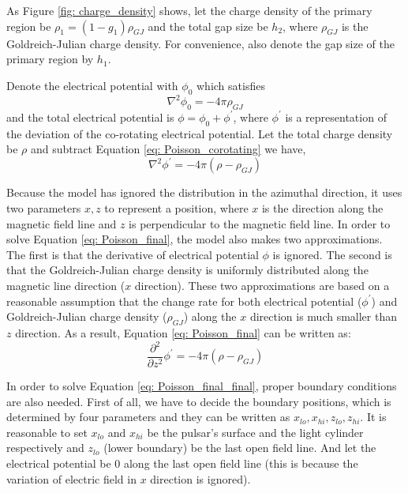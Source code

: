 \documentclass[12pt]{report}
\newcommand{\gj}[0]{
  Goldreich-Julian charge density
}
\newcommand{\myComment}[1]{
  \newline
}
\begin{document}
        As Figure \ref{fig: charge_density} shows, 
        let the charge density of the primary region be $\rho_1 = (1-g_{1}) \rho_{GJ}$ and 
        the total gap size be
        $h_{2}$, where $\rho_{GJ}$ is the Goldreich-Julian charge density. For convenience, 
        also denote the gap size of the primary region by $h_{1}$. 
        \myComment{Then we can calculate electric potential and electric field by solving the 
        Poisson equation }

        Denote the electrical potential with $\phi_{0}$ which satisfies 
        \begin{equation}
          \label{eq: Poisson_corotating}
          \nabla^{2}\phi_{0} = -4\pi\rho_{GJ}
        \end{equation}
        and the total electrical potential is $\phi = \phi_{0} + \phi^{\prime}$, 
        where $\phi^{\prime}$ is a representation of the deviation of the co-rotating 
        electrical potential. Let the total charge density be $\rho$ and subtract 
        Equation \ref{eq: Poisson_corotating} we have,
        \begin{equation}
          \label{eq: Poisson_final}
          \nabla^{2}\phi^{\prime} = -4\pi\left(\rho - \rho_{GJ} \right)
        \end{equation}

      Because the model has ignored the distribution in the azimuthal direction, it uses two 
      parameters $x, z$ to represent a position, where $x$ is the direction along the magnetic 
      field line and $z$ is perpendicular to the magnetic field line. In order to solve 
      Equation \ref{eq: Poisson_final}, the model also makes two approximations. The first is that 
      the derivative of electrical potential $\phi$ is ignored. The second is that the \gj{} 
      is uniformly distributed along the magnetic line direction ($x$ direction). These two 
      approximations are based on a reasonable assumption that the change rate 
      for both electrical potential ($\phi^{\prime}$) and \gj{}($\rho_{GJ}$) along the $x$ 
      direction is much smaller than $z$ direction. 
      As a result, Equation \ref{eq: Poisson_final} can be written as: 
      \begin{equation}
        \label{eq: Poisson_final_final}
        \frac{\partial^2}{\partial z^2} \phi^{\prime} = -4\pi\left(\rho - \rho_{GJ} \right)
      \end{equation}

      In order to solve Equation \ref{eq: Poisson_final_final}, proper boundary conditions are also 
      needed. First of all, we have to decide the boundary positions, which is determined by 
      four parameters and they can be written as $x_{lo}, x_{hi}, z_{lo}, z_{hi}$. It is 
      reasonable to set $x_{lo}$ and $x_{hi}$ be the pulsar's surface and the light cylinder 
      respectively and $z_{lo}$ (lower boundary) be the last open field line. And let the 
      electrical potential be $0$ along the last open field line (this is because the 
      variation of electric field in $x$ direction is ignored).   
\end{document}

